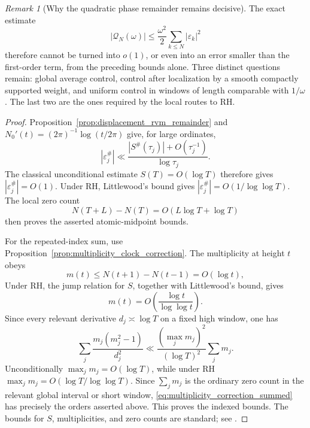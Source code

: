 \documentclass[11pt]{amsart}
\numberwithin{equation}{section}
\theoremstyle{plain}
\theoremstyle{definition}
\theoremstyle{remark}
\newtheorem{remark}[theorem]{Remark}
\newcommand{\1}{\mathbf{1}}
\begin{document}
\begin{remark}[Why the quadratic phase remainder remains decisive]
\label{rem:rvm_quadratic_remainder_decisive}
The exact estimate
\begin{equation}
|\mathcal Q_N(\omega)|
\leq
\frac{\omega^2}{2}
\sum_{k\leq N}|\varepsilon_k|^2
\label{eq:rvm_quadratic_remainder_recalled}
\end{equation}
therefore cannot be turned into \(o(1)\), or even into an error smaller
than the first-order term, from the preceding bounds alone.  Three distinct
questions remain: global average control, control after localization by a
smooth compactly supported weight, and uniform control in windows of length
comparable with \(1/\omega\).  The last two are the ones required by the
local routes to RH.
\end{remark}

\begin{proof}
Proposition~\ref{prop:displacement_rvm_remainder} and
\(N_0'(t)=(2\pi)^{-1}\log(t/2\pi)\) give, for large ordinates,
\begin{equation}
|\varepsilon_j^{\#}|
\ll
\frac{|S^{\#}(\tau_j)|+O(\tau_j^{-1})}{\log\tau_j}.
\label{eq:rvm_epsilon_bound_from_S}
\end{equation}
The classical unconditional estimate \(S(T)=O(\log T)\) therefore gives
\(|\varepsilon_j^{\#}|=O(1)\).  Under RH, Littlewood's bound gives
\(|\varepsilon_j^{\#}|=O(1/\log\log T)\).  The local zero count
\begin{equation}
N(T+L)-N(T)=O(L\log T+\log T)
\label{eq:rvm_local_zero_count}
\end{equation}
then proves the asserted atomic-midpoint bounds.

For the repeated-index sum, use
Proposition~\ref{prop:multiplicity_clock_correction}.  The multiplicity at
height \(t\) obeys
\begin{equation}
m(t)\leq N(t+1)-N(t-1)=O(\log t),
\label{eq:multiplicity_crude_bound}
\end{equation}
Under RH, the jump relation for \(S\), together with Littlewood's bound,
gives
\begin{equation}
m(t)=O\!\left(\frac{\log t}{\log\log t}\right).
\label{eq:multiplicity_RH_bound}
\end{equation}
Since every relevant derivative
\(d_j\asymp\log T\) on a fixed high window, one has
\begin{equation}
\sum_j\frac{m_j(m_j^2-1)}{d_j^2}
\ll
\frac{(\max_j m_j)^2}{(\log T)^2}\sum_jm_j.
\label{eq:multiplicity_correction_summed}
\end{equation}
Unconditionally \(\max_jm_j=O(\log T)\), while under RH
\(\max_jm_j=O(\log T/\log\log T)\).  Since \(\sum_jm_j\) is the
ordinary zero count in the relevant global interval or short window,
\eqref{eq:multiplicity_correction_summed} has precisely the orders asserted
above.  This proves the indexed bounds.  The
bounds for \(S\), multiplicities, and zero counts are standard; see
\cite[Chapters~9 and~14]{Titchmarsh1986}.
\end{proof}
\end{document}
